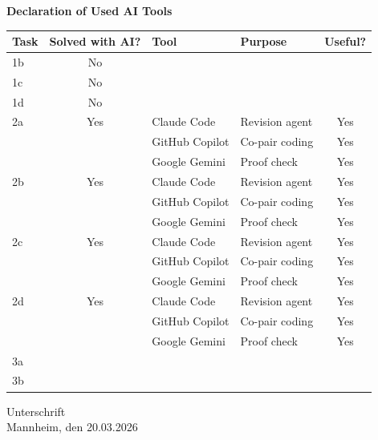 \begin{center}
  \textbf{Declaration of Used AI Tools} \\[.3em]
  \begin{tabularx}{\textwidth}{lclXc}
    \toprule
    Task & Solved with AI? & Tool & Purpose & Useful? \\
    \midrule
    1b & No & & & \\
    1c & No & & & \\
    1d & No & & & \\
    2a & Yes & Claude Code & Revision agent & Yes \\
       &     & GitHub Copilot & Co-pair coding & Yes \\
       &     & Google Gemini & Proof check & Yes \\
    2b & Yes & Claude Code & Revision agent & Yes \\
       &     & GitHub Copilot & Co-pair coding & Yes \\
       &     & Google Gemini & Proof check & Yes \\
    2c & Yes & Claude Code & Revision agent & Yes \\
       &     & GitHub Copilot & Co-pair coding & Yes \\
       &     & Google Gemini & Proof check & Yes \\
    2d & Yes & Claude Code & Revision agent & Yes \\
       &     & GitHub Copilot & Co-pair coding & Yes \\
       &     & Google Gemini & Proof check & Yes \\
    3a & & & & \\
    3b & & & & \\
    \bottomrule
  \end{tabularx}
\end{center}

\vspace{2cm}
\noindent Unterschrift\\
\noindent Mannheim, den 20.03.2026 \hfill